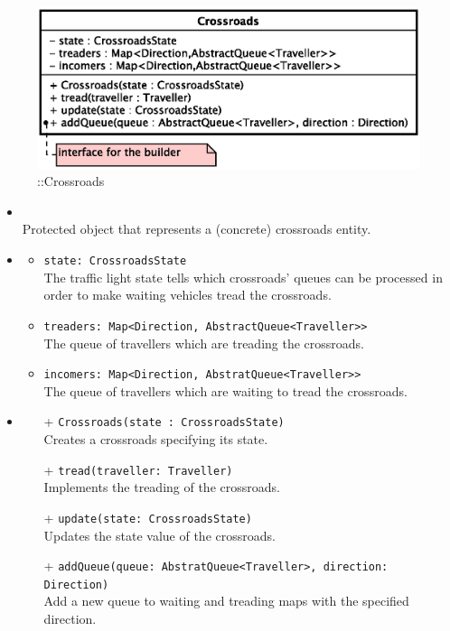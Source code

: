 \begin{figure}[h]
\centering
\includegraphics[scale=0.6,keepaspectratio]{images/solution/app/backend/crossroads.eps}
\caption{\pReactiveComponent::Crossroads}
\label{fig:sd-app-crossroads}
\end{figure}
\FloatBarrier
\begin{itemize}
  \item \textbf{\descr} \\
    Protected object that represents a (concrete) crossroads entity.
  \item \textbf{\attrs}
  \begin{itemize}
    \item \texttt{state: CrossroadsState} \\
The traffic light state tells which crossroads' queues can be processed in
order to make waiting vehicles tread the crossroads.
    \item \texttt{treaders: Map<Direction, AbstractQueue<Traveller>>} \\
The queue of travellers which are treading the crossroads.
    \item \texttt{incomers: Map<Direction, AbstratQueue<Traveller>>} \\
The queue of travellers which are waiting to tread the crossroads. 
  \end{itemize}
  \item \textbf{\ops}
  \begin{itemize}
    \item[+] \texttt{Crossroads(state : CrossroadsState)} \\
Creates a crossroads specifying its state.
    \item[+] \texttt{tread(traveller: Traveller)} \\
Implements the treading of the crossroads.
    \item[+] \texttt{update(state: CrossroadsState)} \\
Updates the state value of the crossroads.
    \item[+] \texttt{addQueue(queue: AbstratQueue<Traveller>, direction: 
Direction)} \\
Add a new queue to waiting and treading maps with the specified direction.
  \end{itemize}
\end{itemize}
